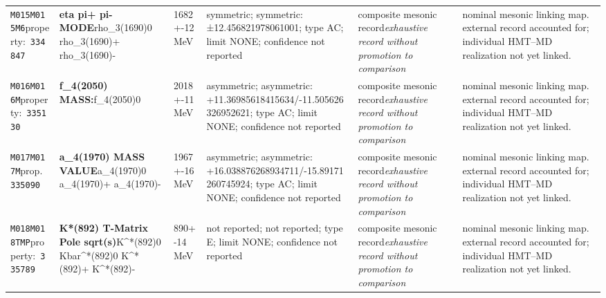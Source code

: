 \begin{landscape}
\begin{longtable}{L{1.85cm}L{4.45cm}L{2.35cm}L{4.05cm}L{3.35cm}L{7.15cm}}
\texttt{M015}\newline \texttt{M015M6}\newline property:\ \texttt{334847} & \textbf{eta pi+ pi- MODE}\newline rho\_\allowbreak{}3(1690)0 \textbar{}\allowbreak{} rho\_\allowbreak{}3(1690)+ \textbar{}\allowbreak{} rho\_\allowbreak{}3(1690)- & 1682+-12\,MeV & symmetric; symmetric: ±12.456821978061001; type AC; limit NONE; confidence not reported & composite mesonic record\newline \emph{exhaustive record without promotion to comparison} & nominal mesonic linking map. external record accounted for; individual HMT--MD realization not yet linked. \\
\texttt{M016}\newline \texttt{M016M}\newline property:\ \texttt{335130} & \textbf{f\_\allowbreak{}4(2050) MASS:}\newline f\_\allowbreak{}4(2050)0 & 2018+-11\,MeV & asymmetric; asymmetric: +11.36985618415634/-11.505626326952621; type AC; limit NONE; confidence not reported & composite mesonic record\newline \emph{exhaustive record without promotion to comparison} & nominal mesonic linking map. external record accounted for; individual HMT--MD realization not yet linked. \\
\texttt{M017}\newline \texttt{M017M}\newline prop.\ \texttt{335090} & \textbf{a\_\allowbreak{}4(1970) MASS VALUE}\newline a\_\allowbreak{}4(1970)0 \textbar{}\allowbreak{} a\_\allowbreak{}4(1970)+ \textbar{}\allowbreak{} a\_\allowbreak{}4(1970)- & 1967+-16\,MeV & asymmetric; asymmetric: +16.038876268934711/-15.89171260745924; type AC; limit NONE; confidence not reported & composite mesonic record\newline \emph{exhaustive record without promotion to comparison} & nominal mesonic linking map. external record accounted for; individual HMT--MD realization not yet linked. \\
\texttt{M018}\newline \texttt{M018TMP}\newline property:\ \texttt{335789} & \textbf{K*(892) T-Matrix Pole sqrt(s)}\newline K\textasciicircum{}*(892)0 \textbar{}\allowbreak{} Kbar\textasciicircum{}*(892)0 \textbar{}\allowbreak{} K\textasciicircum{}*(892)+ \textbar{}\allowbreak{} K\textasciicircum{}*(892)- & 890+-14\,MeV & not reported; not reported; type E; limit NONE; confidence not reported & composite mesonic record\newline \emph{exhaustive record without promotion to comparison} & nominal mesonic linking map. external record accounted for; individual HMT--MD realization not yet linked. \\

\end{longtable}
\end{landscape}
